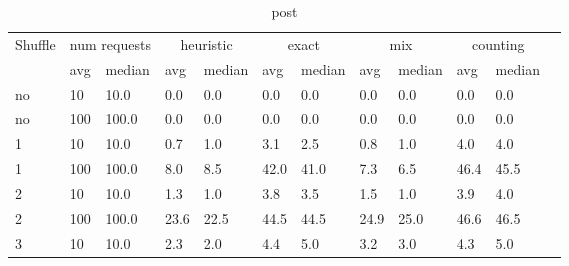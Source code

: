 \documentclass[12pt,a4paper]{report}
\begin{document}
\begin{table}[h]
	\centering
	\caption{post}
	\label{tab:post}
	\begin{tabular}{|l|l|l|l|l|l|l|l|l|l|l|l|}
		\hline
		\multirow{2}{*}{Shuffle} & \multicolumn{2}{|c|}{num requests} & \multicolumn{2}{|c|}{heuristic} & \multicolumn{2}{|c|}{exact} & \multicolumn{2}{|c|}{mix} & \multicolumn{2}{|c|}{counting}                                          \\ \cline{2-11}
		                         & avg                                & median                          & avg                         & median                    & avg                            & median & avg  & median & avg  & median \\ \hline
		no                       & 10                                 & 10.0                            & 0.0                         & 0.0                       & 0.0                            & 0.0    & 0.0  & 0.0    & 0.0  & 0.0    \\ \hline
		no                       & 100                                & 100.0                           & 0.0                         & 0.0                       & 0.0                            & 0.0    & 0.0  & 0.0    & 0.0  & 0.0    \\ \hline
		1                        & 10                                 & 10.0                            & 0.7                         & 1.0                       & 3.1                            & 2.5    & 0.8  & 1.0    & 4.0  & 4.0    \\ \hline
		1                        & 100                                & 100.0                           & 8.0                         & 8.5                       & 42.0                           & 41.0   & 7.3  & 6.5    & 46.4 & 45.5   \\ \hline
		2                        & 10                                 & 10.0                            & 1.3                         & 1.0                       & 3.8                            & 3.5    & 1.5  & 1.0    & 3.9  & 4.0    \\ \hline
		2                        & 100                                & 100.0                           & 23.6                        & 22.5                      & 44.5                           & 44.5   & 24.9 & 25.0   & 46.6 & 46.5   \\ \hline
		3                        & 10                                 & 10.0                            & 2.3                         & 2.0                       & 4.4                            & 5.0    & 3.2  & 3.0    & 4.3  & 5.0    \\ \hline

\end{tabular}
\end{table}
\end{document}
